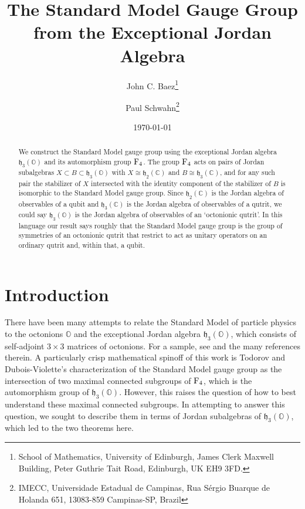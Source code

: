 \documentclass{article}
\title{The Standard Model Gauge Group \\
from the Exceptional Jordan Algebra }
\author{John C. Baez\footnote{School of Mathematics, University of Edinburgh, James Clerk Maxwell Building, Peter Guthrie Tait Road, Edinburgh, UK EH9 3FD.} \and
Paul Schwahn\footnote{IMECC, Universidade Estadual de Campinas, Rua S\'ergio Buarque de Holanda 651,
13083-859 Campinas-SP, Brazil}}
\date{\today}
\theoremstyle{plain}
\theoremstyle{remark}
\theoremstyle{definition}
\newcommand{\C}{{\mathbb C}}  %
\renewcommand{\O}{{\mathbb O}}  %
\newcommand{\F}{{\rm F}}       %
\newcommand{\h}{\mathfrak{h}}  %
\begin{document}
\maketitle

\begin{abstract}
We construct the Standard Model gauge group using the exceptional Jordan algebra $\h_3(\O)$ and its automorphism group $\F_4$.  The group $\F_4$ acts on pairs of Jordan subalgebras $X \subset B \subset \h_3(\O)$ with $X \cong \h_2(\C)$ and $B \cong \h_3(\C)$, and for any such pair the stabilizer of $X$ intersected with the identity component of the stabilizer of $B$ is isomorphic to the Standard Model gauge group.   Since $\h_2(\C)$ is the Jordan algebra of observables of a qubit and $\h_3(\C)$ is the Jordan algebra of observables of a qutrit, we could say $\h_3(\O)$ is the Jordan algebra of observables of an `octonionic qutrit'.   In this language our result says roughly that the Standard Model gauge group is the group of symmetries of an octonionic qutrit that restrict to act as unitary operators on an ordinary qutrit and, within that, a qubit. 
\end{abstract}

\section{Introduction}

There have been many attempts to relate the Standard Model of particle physics to the octonions $\O$ and the exceptional Jordan algebra $\h_3(\O)$, which consists of self-adjoint $3 \times 3$ matrices of octonions.  For a sample, see \cite{Boyle,Dixon,DV,Furey,GurseyTze,Krasnov} and the many references therein.  A particularly crisp mathematical spinoff of this work is Todorov and Dubois-Violette's \cite{TDV} characterization of the Standard Model gauge group as the intersection of two maximal connected subgroups of $\F_4$, which is the automorphism group of $\h_3(\O)$.  However, this raises the question of how to best understand these maximal connected subgroups.  In attempting to answer this question, we sought to describe them in terms of Jordan subalgebras of $\h_3(\O)$, which led to the two theorems here.
\end{document}
